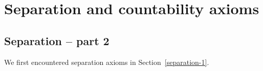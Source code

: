 \section{Separation and countability axioms}
\label{separation}
\subsection{Separation -- part 2}
We first encountered separation axioms in Section~\ref{separation-1}.
